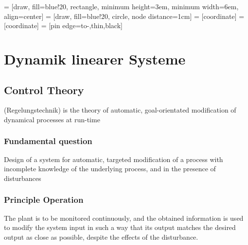 

 = [draw, fill=blue!20, rectangle, 
minimum height=3em, minimum width=6em, align=center]
 = [draw, fill=blue!20, circle, node distance=1cm]
 = [coordinate]
 = [coordinate]
 = [pin edge={to-,thin,black}]

\section{Dynamik linearer Systeme}%
\label{dls:sec:dynamik_linearer_systeme}

\subsection{Control Theory}%
\label{dls:sub:control_theory}
(Regelungstechnik) is the theory of automatic, goal-orientated modification of dynamical processes at run-time

\subsubsection{Fundamental question}%
\label{dls:ssub:fundamental_question}
Design of a system for automatic, targeted modification of a process with incomplete knowledge of the underlying
process, and in the presence of disturbances

\subsubsection{Principle Operation}%
\label{dls:ssub:principle_operation}
The plant is to be monitored continuously, and the obtained information is used to modify the system input in such a
way that its output matches the desired output as close as possible, despite the effects of the disturbance.


